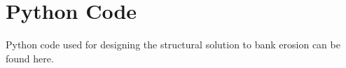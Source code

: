 \chapter{Python Code}

Python code used for designing the structural solution to bank erosion can be found here.


\begin{comment}
\begin{lstlisting}[language=Python]
"""
ISA Calculator: import the function, specify the height and it will return a
list in the following format: [Temperature,Density,Pressure,Speed of Sound].
Note that there is no check to see if the maximum altitude is reached.
"""

import math
g0 = 9.80665
R = 287.0
layer1 = [0, 288.15, 101325.0]
alt = [0,11000,20000,32000,47000,51000,71000,86000]
a = [-.0065,0,.0010,.0028,0,-.0028,-.0020]

def atmosphere(h):
    for i in range(0,len(alt)-1):
        if h >= alt[i]:
            layer0 = layer1[:]
            layer1[0] = min(h,alt[i+1])
            if a[i] != 0:
                layer1[1] = layer0[1] + a[i]*(layer1[0]-layer0[0])
                layer1[2] = layer0[2] * (layer1[1]/layer0[1])**(-g0/(a[i]*R))
            else:
                layer1[2] = layer0[2]*math.exp((-g0/(R*layer1[1]))*(layer1[0]-layer0[0]))
    return [layer1[1],layer1[2]/(R*layer1[1]),layer1[2],math.sqrt(1.4*R*layer1[1])]
\end{lstlisting}
\end{comment}